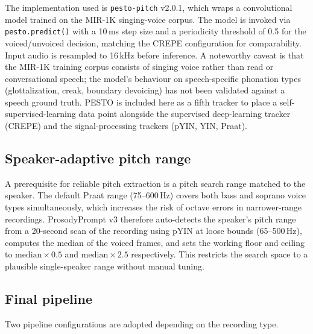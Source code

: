 \begin{enumerate}
      The implementation used is \texttt{pesto-pitch} v2.0.1, which wraps a
      convolutional model trained on the MIR-1K singing-voice corpus. The model
      is invoked via \texttt{pesto.predict()} with a 10\,ms step size and a
      periodicity threshold of 0.5 for the voiced/unvoiced decision, matching the
      CREPE configuration for comparability. Input audio is resampled to 16\,kHz
      before inference. A noteworthy caveat is that the MIR-1K training corpus
      consists of singing voice rather than read or conversational speech; the
      model's behaviour on speech-specific phonation types (glottalization,
      creak, boundary devoicing) has not been validated against a speech ground
      truth. PESTO is included here as a fifth tracker to place a
      self-supervised-learning data point alongside the supervised deep-learning
      tracker (CREPE) and the signal-processing trackers (pYIN, YIN, Praat).

\end{enumerate}

\subsection{Speaker-adaptive pitch range}

A prerequisite for reliable pitch extraction is a pitch search range matched to
the speaker. The default Praat range (75--600\,Hz) covers both bass and soprano
voice types simultaneously, which increases the risk of octave errors in
narrower-range recordings. ProsodyPrompt v3 therefore auto-detects the speaker's
pitch range from a 20-second scan of the recording using pYIN at loose bounds
(65--500\,Hz), computes the median of the voiced frames, and sets the working
floor and ceiling to $\text{median} \times 0.5$ and $\text{median} \times 2.5$
respectively. This restricts the search space to a plausible single-speaker range
without manual tuning.

\subsection{Final pipeline}

Two pipeline configurations are adopted depending on the recording type.

